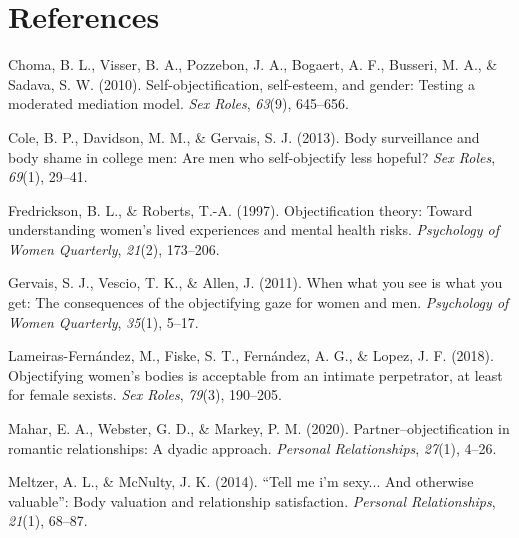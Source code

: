 \documentclass[
  man]{apa6}
\newlength{\cslhangindent}
\newlength{\cslentryspacingunit} %
\newenvironment{CSLReferences}[2] %
 {%
  \setlength{\parindent}{0pt}
  \ifodd #1
  \let\oldpar\par
  \def\par{\hangindent=\cslhangindent\oldpar}
  \fi
  \setlength{\parskip}{#2\cslentryspacingunit}
 }%
 {}
\begin{document}
\newpage

\hypertarget{references}{%
\section{References}\label{references}}

\begingroup
\setlength{\parindent}{-0.5in}
\setlength{\leftskip}{0.5in}

\hypertarget{refs}{}
\begin{CSLReferences}{1}{0}
\leavevmode{}%
Choma, B. L., Visser, B. A., Pozzebon, J. A., Bogaert, A. F., Busseri, M. A., \& Sadava, S. W. (2010). Self-objectification, self-esteem, and gender: Testing a moderated mediation model. \emph{Sex Roles}, \emph{63}(9), 645--656.

\leavevmode{}%
Cole, B. P., Davidson, M. M., \& Gervais, S. J. (2013). Body surveillance and body shame in college men: Are men who self-objectify less hopeful? \emph{Sex Roles}, \emph{69}(1), 29--41.

\leavevmode{}%
Fredrickson, B. L., \& Roberts, T.-A. (1997). Objectification theory: Toward understanding women's lived experiences and mental health risks. \emph{Psychology of Women Quarterly}, \emph{21}(2), 173--206.

\leavevmode{}%
Gervais, S. J., Vescio, T. K., \& Allen, J. (2011). When what you see is what you get: The consequences of the objectifying gaze for women and men. \emph{Psychology of Women Quarterly}, \emph{35}(1), 5--17.

\leavevmode{}%
Lameiras-Fernández, M., Fiske, S. T., Fernández, A. G., \& Lopez, J. F. (2018). Objectifying women's bodies is acceptable from an intimate perpetrator, at least for female sexists. \emph{Sex Roles}, \emph{79}(3), 190--205.

\leavevmode{}%
Mahar, E. A., Webster, G. D., \& Markey, P. M. (2020). Partner--objectification in romantic relationships: A dyadic approach. \emph{Personal Relationships}, \emph{27}(1), 4--26.

\leavevmode{}%
Meltzer, A. L., \& McNulty, J. K. (2014). {``Tell me i'm sexy... And otherwise valuable''}: Body valuation and relationship satisfaction. \emph{Personal Relationships}, \emph{21}(1), 68--87.


\end{CSLReferences}
\end{document}
